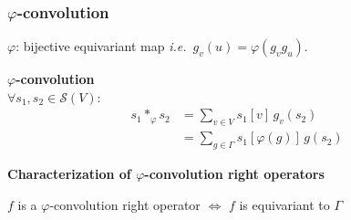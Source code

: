 \documentclass[t,9pt,pdftex]{beamer}
\theoremstyle{definition}
\newcommand{\cl}{\mathcal{L}}
\newcommand{\cs}{\mathcal{S}}
\newcommand{\ie}{\emph{i.e.}~}
\newcommand{\st}{\emph{s.t.}~}
\newcommand{\h}[1]{\hspace{#1pt}}
\begin{document}
\begin{frame}[c, label=current]
  \frametitle{$\varphi$-convolution}
  $\varphi$: bijective equivariant map \ie $g_v(u) = \varphi(g_v g_u)$.
  \begin{definition}\textbf{$\varphi$-convolution}\\
  $\forall s_1, s_2 \in \cs(V)$:
  \begin{align}
  s_1 \ast_{\varphi} s_2 & = \displaystyle \sum_{v \in V} s_1[v] \h{2} g_v(s_2)\label{eq:vdom}\\
  & = \displaystyle \sum_{g \in \Gamma} s_1[\varphi(g)] \h{2} g(s_2) \label{eq:premix}
  \end{align}
  \end{definition}

\begin{theorem}\textbf{Characterization of $\varphi$-convolution right operators}\\
\centerline{$f$ is a $\varphi$-convolution right operator $\Leftrightarrow$ $f$ is equivariant to $\Gamma$}
\label{prop:equiG}
\end{theorem}


\end{frame}
\end{document}
